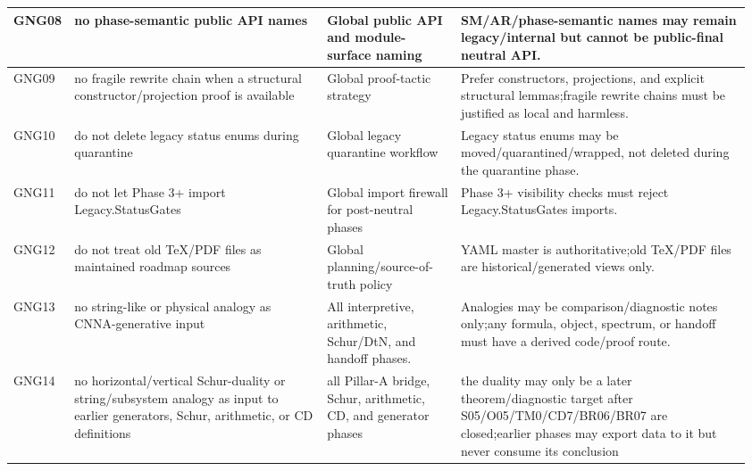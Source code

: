\begin{longtable}{L{0.045\linewidth} L{0.345\linewidth} L{0.185\linewidth} L{0.39\linewidth}}
\hline
\addlinespace[0.24em]
GNG08 & no phase-semantic public API names & Global public API and module-surface naming & SM/\allowbreak{}AR/\allowbreak{}phase-semantic names may remain legacy/\allowbreak{}internal but cannot be public-final neutral API.\\
\hline
\addlinespace[0.24em]
GNG09 & no fragile rewrite chain when a structural constructor/\allowbreak{}projection proof is available & Global proof-tactic strategy & Prefer constructors, projections, and explicit structural lemmas;\newline fragile rewrite chains must be justified as local and harmless.\\
\hline
\addlinespace[0.24em]
GNG10 & do not delete legacy status enums during quarantine & Global legacy quarantine workflow & Legacy status enums may be moved/\allowbreak{}quarantined/\allowbreak{}wrapped, not deleted during the quarantine phase.\\
\hline
\addlinespace[0.24em]
GNG11 & do not let Phase 3+ import Legacy.StatusGates & Global import firewall for post-neutral phases & Phase 3+ visibility checks must reject Legacy.StatusGates imports.\\
\hline
\addlinespace[0.24em]
GNG12 & do not treat old TeX/\allowbreak{}PDF files as maintained roadmap sources & Global planning/\allowbreak{}source-of-truth policy & YAML master is authoritative;\newline old TeX/\allowbreak{}PDF files are historical/\allowbreak{}generated views only.\\
\hline
\addlinespace[0.24em]
GNG13 & no string-like or physical analogy as CNNA-generative input & All interpretive, arithmetic, Schur/\allowbreak{}DtN, and handoff phases. & Analogies may be comparison/\allowbreak{}diagnostic notes only;\newline any formula, object, spectrum, or handoff must have a derived code/\allowbreak{}proof route.\\
\hline
\addlinespace[0.24em]
GNG14 & no horizontal/\allowbreak{}vertical Schur-duality or string/\allowbreak{}subsystem analogy as input to earlier generators, Schur, arithmetic, or CD definitions & all Pillar-A bridge, Schur, arithmetic, CD, and generator phases & the duality may only be a later theorem/\allowbreak{}diagnostic target after S05/\allowbreak{}O05/\allowbreak{}TM0/\allowbreak{}CD7/\allowbreak{}BR06/\allowbreak{}BR07 are closed;\newline earlier phases may export data to it but never consume its conclusion\\

\end{longtable}
